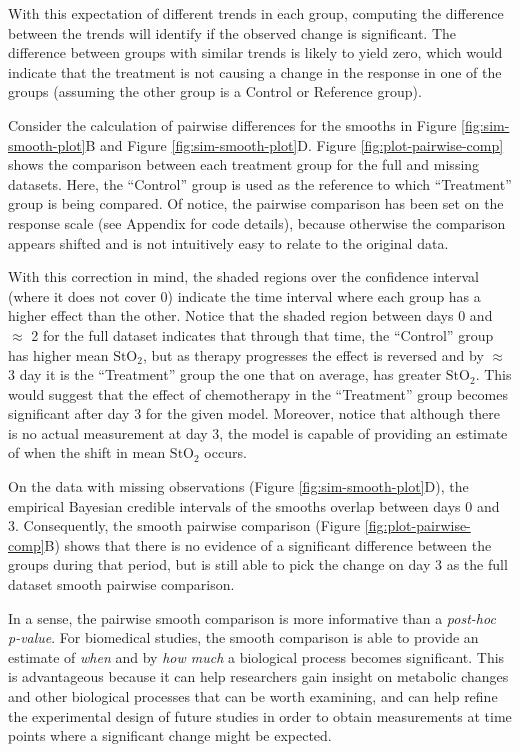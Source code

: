 \documentclass[Royal,times,doublespace,sagev]{sagej}
\begin{document}
With this expectation of different trends in each group, computing the difference between the trends will identify if the observed change is significant. The difference between groups with similar trends is likely to yield zero, which would indicate that the treatment is not causing a change in the response in one of the groups (assuming the other group is a Control or Reference group).

Consider the calculation of pairwise differences for the smooths in Figure \ref{fig:sim-smooth-plot}B and Figure \ref{fig:sim-smooth-plot}D. Figure \ref{fig:plot-pairwise-comp} shows the comparison between each treatment group for the full and missing datasets. Here, the ``Control'' group is used as the reference to which ``Treatment'' group is being compared. Of notice, the pairwise comparison has been set on the response scale (see Appendix for code details), because otherwise the comparison appears shifted and is not intuitively easy to relate to the original data.

With this correction in mind, the shaded regions over the confidence interval (where it does not cover 0) indicate the time interval where each group has a higher effect than the other. Notice that the shaded region between days 0 and \(\approx\) 2 for the full dataset indicates that through that time, the ``Control'' group has higher mean \(\mbox{StO}_2\), but as therapy progresses the effect is reversed and by \(\approx\) 3 day it is the ``Treatment'' group the one that on average, has greater \(\mbox{StO}_2\). This would suggest that the effect of chemotherapy in the ``Treatment'' group becomes significant after day 3 for the given model. Moreover, notice that although there is no actual measurement at day 3, the model is capable of providing an estimate of when the shift in mean \(\mbox{StO}_2\) occurs.

On the data with missing observations (Figure \ref{fig:sim-smooth-plot}D), the empirical Bayesian credible intervals of the smooths overlap between days 0 and 3. Consequently, the smooth pairwise comparison (Figure \ref{fig:plot-pairwise-comp}B) shows that there is no evidence of a significant difference between the groups during that period, but is still able to pick the change on day 3 as the full dataset smooth pairwise comparison.

In a sense, the pairwise smooth comparison is more informative than a \emph{post-hoc} \emph{p-value}. For biomedical studies, the smooth comparison is able to provide an estimate of \emph{when} and by \emph{how much} a biological process becomes significant. This is advantageous because it can help researchers gain insight on metabolic changes and other biological processes that can be worth examining, and can help refine the experimental design of future studies in order to obtain measurements at time points where a significant change might be expected.
\end{document}
